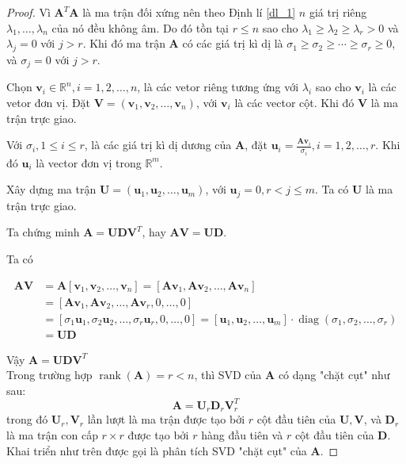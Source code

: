 \documentclass[12pt,a4paper,oneside]{report}
\numberwithin{equation}{section}
\begin{document}
\begin{proof}
Vì $\mathbf{A}^{T} \mathbf{A}$ là ma trận đối xứng nên theo Định lí \ref{dl_1} $n$ giá trị riêng $\lambda_{1}, \ldots, \lambda_{n}$ của nó đều không âm. Do đó tồn tại $r \leqslant n$ sao cho $\lambda_{1} \geqslant \lambda_{2} \geqslant \lambda_{r}>0$ và $\lambda_{j}=0$ với $j>r$. Khi đó ma trận $\mathbf{A}$ có các giá trị kì dị là $\sigma_{1} \geqslant \sigma_{2} \geqslant \cdots \geqslant \sigma_{r} \geqslant 0$, và $\sigma_{j}=0$ với $j>r$.

Chọn $\mathbf{v}_{i} \in \mathbb{R}^{n}, i=1,2, \ldots, n$, là các vetor riêng tương ứng với $\lambda_{i}$ sao cho $\mathbf{v}_{i}$ là các vetor đơn vị. Đặt $\mathbf{V}=\left(\mathbf{v}_{1}, \mathbf{v}_{2}, \ldots, \mathbf{v}_{n}\right)$, với $\mathbf{v}_{i}$ là các vector cột. Khi đó $\mathbf{V}$ là ma trận trực giao.

Với $\sigma_{i}, 1 \leqslant i \leqslant r$, là các giá trị kì dị dương của $\mathbf{A}$, đặt $\mathbf{u}_{i}=\frac{\mathbf{A v}_{i}}{\sigma_{i}}, i=1,2, \ldots, r$. Khi đó $\mathbf{u}_{i}$ là vector đơn vị trong $\mathbb{R}^{m}$.

Xây dựng ma trận $\mathbf{U}=\left(\mathbf{u}_{1}, \mathbf{u}_{2}, \ldots, \mathbf{u}_{m}\right)$, với $\mathbf{u}_{j}=0, r<j \leqslant m$. Ta có $\mathbf{U}$ là ma trận trực giao.

Ta chứng minh $\mathbf{A}=\mathbf{U D V}^{T}$, hay $\mathbf{A V}=\mathbf{U D}$.

Ta có

$$
\begin{aligned}
	\mathbf{A} \mathbf{V} & =\mathbf{A}\left[\mathbf{v}_{1}, \mathbf{v}_{2}, \ldots, \mathbf{v}_{n}\right]=\left[\mathbf{A v}_{1}, \mathbf{A v}_{2}, \ldots, \mathbf{A} \mathbf{v}_{n}\right]\\
	&=\left[\mathbf{A v}_{1}, \mathbf{A v}_{2}, \ldots, \mathbf{A v}_{r}, 0, \ldots, 0\right] \\
	& =\left[\sigma_{1} \mathbf{u}_{1}, \sigma_{2} \mathbf{u}_{2}, \ldots, \sigma_{r} \mathbf{u}_{r}, 0, \ldots, 0\right]=\left[\mathbf{u}_{1}, \mathbf{u}_{2}, \ldots, \mathbf{u}_{m}\right] \cdot \operatorname{diag}\left(\sigma_{1}, \sigma_{2}, \ldots, \sigma_{r}\right) \\
	& =\mathbf{U D}
\end{aligned}
$$

Vậy $\mathbf{A}=\mathbf{U D V}^{T}$\\%
Trong trường hợp $\operatorname{rank}(\mathbf{A})=r<n$, thì SVD của $\mathbf{A}$ có dạng "chặt cụt" như sau:
$$
\mathbf{A}=\mathbf{U}_r \mathbf{D}_r \mathbf{V}_r^T
$$
trong đó $\mathbf{U}_r, \mathbf{V}_r$ lần lượt là ma trận được tạo bởi $r$ cột đầu tiên của $\mathbf{U}, \mathbf{V}$, và $\mathbf{D}_r$ là ma trận con cấp $r \times r$ được tạo bởi $r$ hàng đầu tiên và $r$ cột đầu tiên của $\mathbf{D}$. Khai triển
như trên được gọi là phân tích SVD "chặt cụt" của $\mathbf{A}$.
\end{proof}
\end{document}
